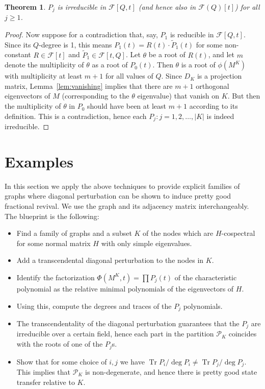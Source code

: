 \documentclass[11pt]{article}
\newtheorem{theorem}[theo]{Theorem}
\theoremstyle{definition}
\numberwithin{equation}{section}
\newcommand{\PK}[1][K]{\mathcal{P}_{#1}}
\newcommand\+{\mkern2mu}
\newcommand{\F}{\mathcal{F}}
\newcommand{\1}{\mathbf 1}
\DeclareMathOperator{\Tr}{Tr}
\begin{document}
\begin{theorem}\label{thm:irreducible}
$P_j$ is irreducible in $\F[Q,t]$ (and hence also in $\F(Q)[t]$) for all $j \geq 1$.
\end{theorem}
\begin{proof}

Now suppose for a contradiction that, say, $P_1$ is reducible in $\F[Q,t]$. Since its $Q$-degree is 1, this means $P_1(t) = R(t) \cdot \tilde{P}_1(t)$ for some non-constant $R \in \F[t]$ and $\tilde{P}_1 \in \F[t,Q]$. Let $\theta$ be a root of $R(t)$, and let $m$ denote the multiplicity of $\theta$ as a root of $P_0(t)$.
Then $\theta$ is a root of $\phi(M^K)$ with multiplicity at least $m+1$ for all values of $Q$. Since $D_K$ is a projection matrix, Lemma~\ref{lem:vanishing} implies that there are $m+1$ orthogonal eigenvectors of $M$ (corresponding to the $\theta$ eigenvalue) that vanish on $K$. But then the multiplicity of $\theta$ in $P_0$ should have been at least $m+1$ according to its definition. This is a contradiction, hence each $P_j : j=1,2,\dots,|K|$ is indeed irreducible.  
\end{proof}

\section{Examples}\label{sec:examples}

In this section we apply the above techniques to provide explicit families of graphs where diagonal perturbation can be shown to induce pretty good fractional revival. We use the graph and its adjacency matrix interchangeably. The blueprint is the following:
\begin{itemize}
\item Find a family of graphs and a subset $K$ of the nodes which are $H$-cospectral for some normal matrix $H$ with only simple eigenvalues.
\item Add a transcendental diagonal perturbation to the nodes in $K$.
\item Identify the factorization $\Phi(M^K,t) = \prod P_j(t)$ of the characteristic polynomial as the relative minimal polynomials of the eigenvectors of $H$. 
\item Using this, compute the degrees and traces of the $P_j$ polynomials.
\item The transcendentality of the diagonal perturbation guarantees that the $P_j$ are irreducible over a certain field, hence each part in the partition $\PK$ coincides with the roots of one of the $P_j$s. 
\item Show that for some choice of $i,j$ we have $\Tr P_i / \deg P_i \neq \Tr P_j /\deg P_j$. This implies that $\PK$ is non-degenerate, and hence there is pretty good state transfer relative to $K$. 
\end{itemize}
\end{document}
